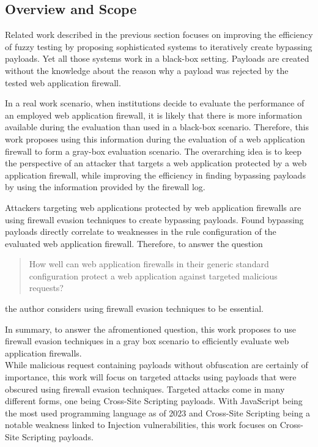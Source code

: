 \subsection{Overview and Scope}
Related work described in the previous section focuses on improving the efficiency of fuzzy testing by proposing sophisticated systems to iteratively create bypassing payloads. Yet all those systems work in a black-box setting. Payloads are created without the knowledge about the reason why a payload was rejected by the tested web application firewall.

In a real work scenario, when institutions decide to evaluate the performance of an employed web application firewall, it is likely that there is more information available during the evaluation than used in a black-box scenario. 
Therefore, this work proposes using this information during the evaluation of a web application firewall to form a gray-box evaluation scenario. 
The overarching idea is to keep the perspective of an attacker that targets a web application protected by a web application firewall, while improving the efficiency in finding bypassing payloads by using the information provided by the firewall log. 

Attackers targeting web applications protected by web application firewalls are using firewall evasion techniques to create bypassing payloads. 
Found bypassing payloads directly correlate to weaknesses in the rule configuration of the evaluated web application firewall.
Therefore, to answer the question
\begin{quote}
How well can web application firewalls in their generic standard configuration
protect a web application against targeted malicious requests?
\end{quote}
the author considers using firewall evasion techniques to be essential.

In summary, to answer the afromentioned question, this work proposes to use firewall evasion techniques in a gray box scenario to efficiently evaluate web application firewalls. \\

While malicious request containing payloads without obfuscation are certainly of importance, this work will focus on targeted attacks using payloads that were obscured using firewall evasion techniques.
Targeted attacks come in many different forms, one being Cross-Site Scripting payloads.
With JavaScript being the most used programming language as of 2023 and Cross-Site Scripting being a notable weakness linked to Injection vulnerabilities, this work focuses on Cross-Site Scripting payloads. \cite{statista/mostusedlang,OWASP/Injection21}


